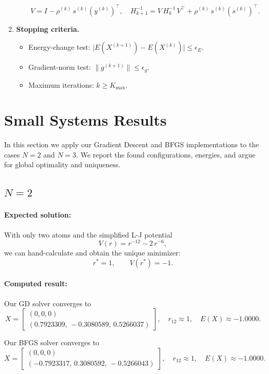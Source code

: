 \documentclass[11pt,onecolumn]{article}
\begin{document}
\begin{enumerate}
\begin{itemize}
        \[
          V = I - \rho^{(k)}\,s^{(k)} (y^{(k)})^\top,\quad
          H_{k+1}^{-1}
          = V\,H_k^{-1}\,V^\top
            + \rho^{(k)}\,s^{(k)} (s^{(k)})^\top.
        \]
    \end{itemize}
  \item \textbf{Stopping criteria.}
    \begin{itemize}
      \item {Energy‐change test:} 
        \(\bigl|E(X^{(k+1)}) - E(X^{(k)})\bigr|\le\epsilon_E\).
      \item {Gradient‐norm test:} 
        \(\|g^{(k+1)}\|\le\epsilon_g\).
      \item {Maximum iterations:} \(k\ge K_{\max}\).
    \end{itemize}
\end{enumerate}

\section{Small Systems Results}

In this section we apply our Gradient Descent and BFGS implementations to the cases \(N=2\) and \(N=3\).  We report the found configurations, energies, and argue for global optimality and uniqueness.

\subsection{\(N=2\)}

\paragraph{Expected solution:}  
With only two atoms and the simplified L-J potential
\[
  V(r) = r^{-12} - 2\,r^{-6},
\]
we can hand-calculate and obtain the unique minimizer:
\[
  r^* = 1,\qquad V(r^*) = -1.
\]

\paragraph{Computed result:}
Our GD solver converges to
\[
  X =
  \begin{bmatrix}
    (0,0,0) \\[3pt]
    (0.7923309,\,-0.3080589,\,0.5266037)
  \end{bmatrix}, \quad
  r_{12} \approx 1,
  \quad
  E(X) \approx -1.0000.
\]


Our BFGS solver converges to
\[
  X =
  \begin{bmatrix}
    (0,0,0) \\[3pt]
    (-0.7923317,\,0.3080592,\,-0.5266043)
  \end{bmatrix}, \quad
  r_{12} \approx 1,
  \quad
  E(X) \approx -1.0000.
\]
\end{document}
